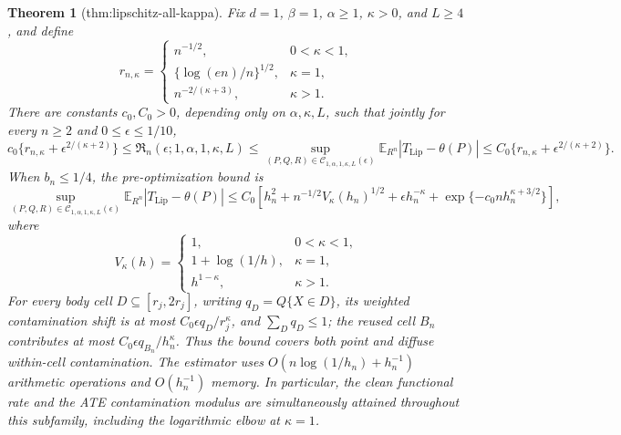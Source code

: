 \documentclass{article}
\newtheorem{theorem}{Theorem}
\begin{document}
\begin{theorem}[thm:lipschitz-all-kappa]\label{thm:lipschitz-all-kappa}
Fix \(d=1\), \(\beta=1\), \(\alpha\geq1\), \(\kappa>0\), and \(L\geq4\), and define
\[
r_{n,\kappa}=
\begin{cases}
n^{-1/2},&0<\kappa<1,\\
\{\log(en)/n\}^{1/2},&\kappa=1,\\
n^{-2/(\kappa+3)},&\kappa>1.
\end{cases}
\]
There are constants \(c_0,C_0>0\), depending only on \(\alpha,\kappa,L\), such that jointly for every \(n\geq2\) and \(0\leq\epsilon\leq1/10\),
\[
c_0\{r_{n,\kappa}+\epsilon^{2/(\kappa+2)}\}
\leq\mathfrak R_n(\epsilon;1,\alpha,1,\kappa,L)
\leq\sup_{(P,Q,R)\in\mathcal C_{1,\alpha,1,\kappa,L}(\epsilon)}
\mathbb E_{R^n}|T_{\mathrm{Lip}}-\theta(P)|
\leq C_0\{r_{n,\kappa}+\epsilon^{2/(\kappa+2)}\}.
\]
When \(b_n\leq1/4\), the pre-optimization bound is
\[
\sup_{(P,Q,R)\in\mathcal C_{1,\alpha,1,\kappa,L}(\epsilon)}
\mathbb E_{R^n}|T_{\mathrm{Lip}}-\theta(P)|
\leq C_0\left[
h_n^2+n^{-1/2}V_\kappa(h_n)^{1/2}
+\epsilon h_n^{-\kappa}
+\exp\{-c_0nh_n^{\kappa+3/2}\}
\right],
\]
where
\[
V_\kappa(h)=
\begin{cases}
1,&0<\kappa<1,\\
1+\log(1/h),&\kappa=1,\\
h^{1-\kappa},&\kappa>1.
\end{cases}
\]
For every body cell \(D\subseteq[r_j,2r_j]\), writing \(q_D=Q\{X\in D\}\), its weighted contamination shift is at most \(C_0\epsilon q_D/r_j^\kappa\), and \(\sum_Dq_D\leq1\); the reused cell \(B_n\) contributes at most \(C_0\epsilon q_{B_n}/h_n^\kappa\). Thus the bound covers both point and diffuse within-cell contamination. The estimator uses \(O(n\log(1/h_n)+h_n^{-1})\) arithmetic operations and \(O(h_n^{-1})\) memory. In particular, the clean functional rate and the ATE contamination modulus are simultaneously attained throughout this subfamily, including the logarithmic elbow at \(\kappa=1\).
\end{theorem}
\end{document}
